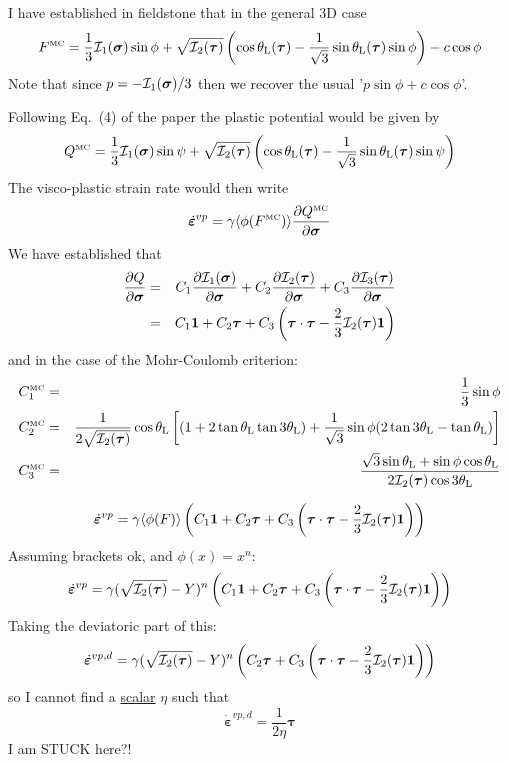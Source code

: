 I have established in fieldstone that in the general 3D case
\begin{equation}
F^{\text{\tiny MC}}=\frac{1}{3} {\cal I}_1({\bm \sigma}) \sin \phi  + 
\sqrt{  {\cal I}_2({\bm \tau})  } \left( \cos \theta_{\rm L}(\bm\tau) - 
\frac{1}{\sqrt{3}} \sin \theta_{\rm L}(\bm\tau)  \sin \phi \right) - c \cos \phi
\end{equation}
Note that since $p=-{\cal I}_1(\bm\sigma)/3$ then we recover the usual '$p\sin\phi+c \cos\phi$'.

Following Eq.~(4) of the paper the plastic potential would be given by 
\[
Q^{\text{\tiny MC}} 
=\frac{1}{3} {\cal I}_1({\bm \sigma}) \sin \psi  + 
\sqrt{  {\cal I}_2({\bm \tau})  } 
\left( \cos \theta_{\rm L}(\bm\tau) -\frac{1}{\sqrt{3}} \sin \theta_{\rm L}(\bm\tau) \sin \psi \right) 
\]
The visco-plastic strain rate would then write
\[
\dot{\bm\varepsilon}^{vp} = \gamma \langle \phi(F^{\text{\tiny MC}}) \rangle 
\frac{\partial Q^{\text{\tiny MC}}}{\partial \bm\sigma}
\]
We have established that 
\begin{eqnarray}
\frac{\partial Q}{\partial \bm\sigma}
&=& 
C_1  \frac{\partial {\cal I}_1(\bm\sigma)}{\partial \bm\sigma} 
+
C_2  \frac{\partial {\cal I}_2(\bm\tau)}{\partial \bm\sigma} 
+
C_3  \frac{\partial {\cal I}_3(\bm\tau)}{\partial \bm\sigma}\nonumber\\
&=& C_1 {\bm 1} + C_2  {\bm \tau} + C_3 \left( \bm\tau\cdot\bm\tau -\frac23 {\cal I}_2(\bm\tau){\bm 1} \right)
\end{eqnarray}
and in the case of the Mohr-Coulomb criterion:
\begin{eqnarray}
C_1^{\text{\tiny MC}} &=& \frac13 \sin\phi  \\ 
C_2^{\text{\tiny MC}} 
&=& 
\frac{1}{2 \sqrt{ {\cal I}_2(\bm\tau)}   }   
\cos \theta_{\rm L}
\left[
(1 +  2\tan \theta_{\rm L}   \tan 3\theta_{\rm L})
+\frac{1}{\sqrt{3}} \sin\phi
( 2\tan 3\theta_{\rm L} - \tan\theta_{\rm L})
\right]
\nonumber\\
C_3^{\text{\tiny MC}} 
&=& 
\frac{
\sqrt{3}\sin\theta_{\rm L}
+
 \sin \phi \cos \theta_{\rm L}
}{2 {\cal I}_2({\bm \tau}) \cos 3\theta_{\rm L}}
\end{eqnarray}



\[
\dot{\bm\varepsilon}^{vp} = \gamma \langle \phi(F) \rangle 
\left(
C_1 {\bm 1} + C_2  {\bm \tau} + C_3 \left( \bm\tau\cdot\bm\tau -\frac23 {\cal I}_2(\bm\tau){\bm 1} \right)
\right)
\]
Assuming brackets ok, and $\phi(x)=x^n$:
\[
\dot{\bm\varepsilon}^{vp} = \gamma (\sqrt{{\cal I}_2(\bm\tau)} - Y)^n 
\left(
C_1 {\bm 1} + C_2  {\bm \tau} + C_3 \left( \bm\tau\cdot\bm\tau -\frac23 {\cal I}_2(\bm\tau){\bm 1} \right)
\right)
\]
Taking the deviatoric part of this:
\[
\dot{\bm\varepsilon}^{vp,d} 
= \gamma (\sqrt{{\cal I}_2(\bm\tau)} - Y)^n 
\left(
 C_2  {\bm \tau} + C_3 \left( \bm\tau\cdot\bm\tau -\frac23 {\cal I}_2(\bm\tau){\bm 1} \right)
\right)
\]
so I cannot find a \underline{scalar} $\eta$ such that 
\[
\dot{\bm\varepsilon}^{vp,d} 
=\frac{1}{2\eta} {\bm \tau}
\]
I am STUCK here?!


